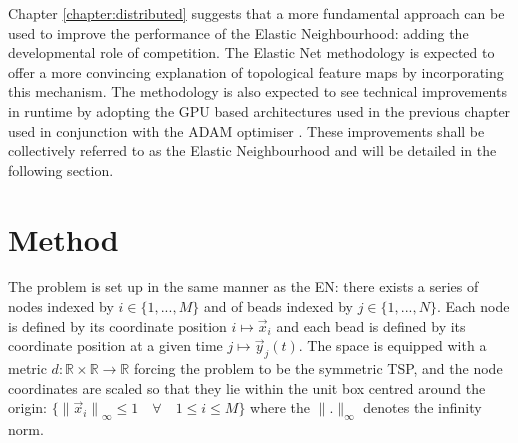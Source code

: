 Chapter \ref{chapter:distributed} suggests that a more fundamental approach can be used to improve the performance of the Elastic Neighbourhood: adding the developmental role of competition. The Elastic Net methodology is expected to offer a more convincing explanation of topological feature maps by incorporating this mechanism. The methodology is also expected to see technical improvements in runtime by adopting the GPU based architectures used in the previous chapter used in conjunction with the ADAM optimiser \cite{kingma2017adam}. These improvements shall be collectively referred to as the Elastic Neighbourhood and will be detailed in the following section.
\section{Method}
The problem is set up in the same manner as the EN: there exists a series of nodes indexed by $i \in \{1, ..., M\}$ and of beads indexed by $j \in \{1, ..., N\}$. Each node is defined by its coordinate position $i \mapsto \vec{x}_i$ and each bead is defined by its coordinate position at a given time $j \mapsto \vec{y}_j(t)$. The space is equipped with a metric $d:  \mathbb{R} \times  \mathbb{R} \rightarrow \mathbb{R}$ forcing the problem to be the symmetric TSP, and the node coordinates are scaled so that they lie within the unit box centred around the origin: $\{  {\lVert \vec{x}_i \rVert}_{\infty}  \leq 1 \quad \forall \quad 1\leq i \leq M \} $ where the $\lVert.\rVert_\infty$ denotes the infinity norm. 
